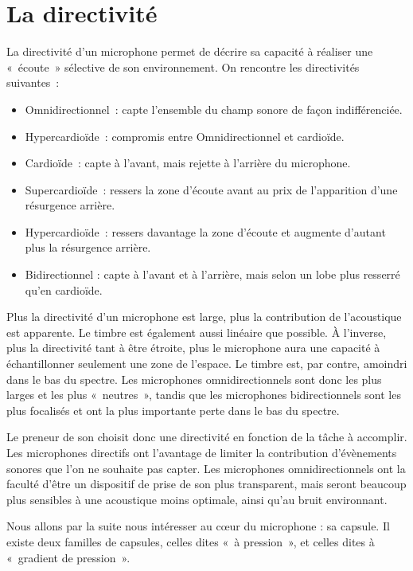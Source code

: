 \documentclass[
]{book}
\providecommand{\tightlist}{%
  \setlength{\itemsep}{0pt}\setlength{\parskip}{0pt}}
\begin{document}
\hypertarget{la-directivituxe9}{%
\section{La directivité}\label{la-directivituxe9}}

La directivité d'un microphone permet de décrire sa capacité à réaliser une «~écoute~» sélective de son environnement. On rencontre les directivités suivantes~:

\begin{itemize}
\tightlist
\item
  Omnidirectionnel~: capte l'ensemble du champ sonore de façon indifférenciée.
\item
  Hypercardioïde~: compromis entre Omnidirectionnel et cardioïde.
\item
  Cardioïde~: capte à l'avant, mais rejette à l'arrière du microphone.
\item
  Supercardioïde~: ressers la zone d'écoute avant au prix de l'apparition d'une résurgence arrière.
\item
  Hypercardioïde~: ressers davantage la zone d'écoute et augmente d'autant plus la résurgence arrière.
\item
  Bidirectionnel : capte à l'avant et à l'arrière, mais selon un lobe plus resserré qu'en cardioïde.
\end{itemize}

Plus la directivité d'un microphone est large, plus la contribution de l'acoustique est apparente. Le timbre est également aussi linéaire que possible. À l'inverse, plus la directivité tant à être étroite, plus le microphone aura une capacité à échantillonner seulement une zone de l'espace. Le timbre est, par contre, amoindri dans le bas du spectre. Les microphones omnidirectionnels sont donc les plus larges et les plus «~neutres~», tandis que les microphones bidirectionnels sont les plus focalisés et ont la plus importante perte dans le bas du spectre.

Le preneur de son choisit donc une directivité en fonction de la tâche à accomplir. Les microphones directifs ont l'avantage de limiter la contribution d'évènements sonores que l'on ne souhaite pas capter. Les microphones omnidirectionnels ont la faculté d'être un dispositif de prise de son plus transparent, mais seront beaucoup plus sensibles à une acoustique moins optimale, ainsi qu'au bruit environnant.

Nous allons par la suite nous intéresser au cœur du microphone : sa capsule. Il existe deux familles de capsules, celles dites «~à pression~», et celles dites à «~gradient de pression~».
\end{document}
